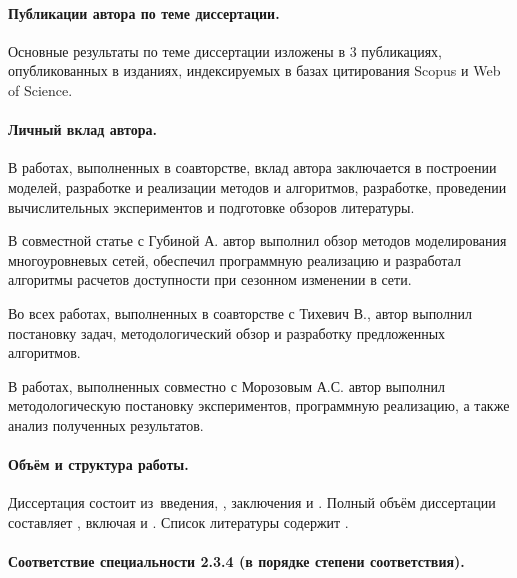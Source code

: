 \paragraph*{Публикации автора по теме диссертации.}
Основные результаты по теме диссертации изложены в 3 публикациях,
опубликованных в изданиях, индексируемых в базах цитирования Scopus и Web of Science.


\paragraph*{Личный вклад автора.}
В работах, выполненных в соавторстве, вклад автора заключается в
построении моделей, разработке и реализации методов и алгоритмов, разработке, проведении вычислительных экспериментов и подготовке обзоров литературы.

В совместной статье с Губиной А. автор выполнил обзор методов моделирования многоуровневых сетей, обеспечил программную реализацию и разработал алгоритмы расчетов доступности при сезонном изменении в сети.

Во всех работах, выполненных в соавторстве с Тихевич В., автор выполнил постановку задач, методологический обзор и разработку предложенных алгоритмов.

В работах, выполненных совместно с Морозовым А.С. автор выполнил методологическую постановку экспериментов, программную реализацию, а также анализ полученных результатов.



\paragraph*{Объём и структура работы.}
Диссертация состоит из~введения,
,
заключения и
.
%
Полный объём диссертации составляет
, включая
 и
.
Список литературы содержит
.

\paragraph*{Соответствие специальности 2.3.4 (в порядке степени соответствия).}

